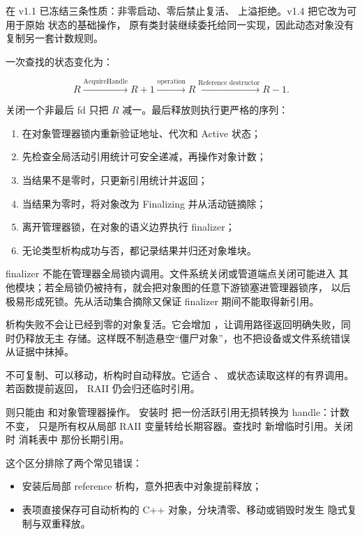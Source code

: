  在 v1.1 已冻结三条性质：非零启动、零后禁止复活、
上溢拒绝。v1.4 把它改为可用于原始  状态的基础操作，
原有类封装继续委托给同一实现，因此动态对象没有复制另一套计数规则。

一次查找的状态变化为：

\[
  R \xrightarrow{\text{AcquireHandle}} R+1
    \xrightarrow{\text{operation}}
  R \xrightarrow{\text{Reference destructor}} R-1.
\]

关闭一个非最后 fd 只把 \(R\) 减一。最后释放则执行更严格的序列：

\begin{enumerate}
  \item 在对象管理器锁内重新验证地址、代次和 Active 状态；
  \item 先检查全局活动引用统计可安全递减，再操作对象计数；
  \item 当结果不是零时，只更新引用统计并返回；
  \item 当结果为零时，将对象改为 Finalizing 并从活动链摘除；
  \item 离开管理器锁，在对象的语义边界执行 finalizer；
  \item 无论类型析构成功与否，都记录结果并归还对象堆块。
\end{enumerate}

finalizer 不能在管理器全局锁内调用。文件系统关闭或管道端点关闭可能进入
其他模块；若全局锁仍被持有，就会把对象图的任意下游锁塞进管理器锁序，
以后极易形成死锁。先从活动集合摘除又保证 finalizer 期间不能取得新引用。

析构失败不会让已经到零的对象复活。它会增加
，让调用路径返回明确失败，同时仍释放无主
存储。这样既不制造悬空“僵尸对象”，也不把设备或文件系统错误从证据中抹掉。

 不可复制、可以移动，析构时自动释放。它适合
、 或状态读取这样的有界调用。若函数提前返回，
RAII 仍会归还临时引用。

 则只能由  和对象管理器操作。
安装时  把一份活跃引用无损转换为 handle：计数不变，
只是所有权从局部 RAII 变量转给长期容器。查找时
 新增临时引用。关闭时  消耗表中
那份长期引用。

这个区分排除了两个常见错误：

\begin{itemize}
  \item 安装后局部 reference 析构，意外把表中对象提前释放；
  \item 表项直接保存可自动析构的 C++ 对象，分块清零、移动或销毁时发生
        隐式复制与双重释放。
\end{itemize}

